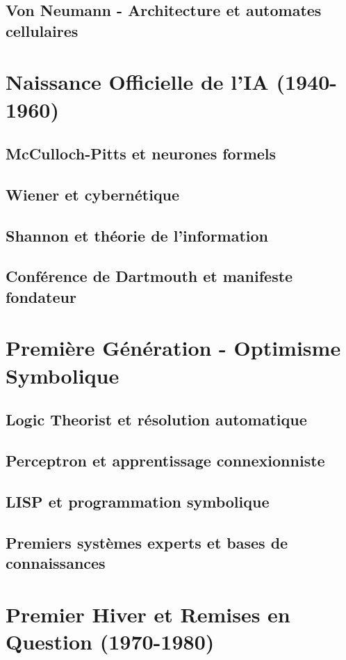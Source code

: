 \documentclass[12pt,a4paper]{book}
\begin{document}
\section{Von Neumann - Architecture et automates cellulaires}

\chapter{Naissance Officielle de l'IA (1940-1960)}
\section{McCulloch-Pitts et neurones formels}
\section{Wiener et cybernétique}
\section{Shannon et théorie de l'information}
\section{Conférence de Dartmouth et manifeste fondateur}

\chapter{Première Génération - Optimisme Symbolique}
\section{Logic Theorist et résolution automatique}
\section{Perceptron et apprentissage connexionniste}
\section{LISP et programmation symbolique}
\section{Premiers systèmes experts et bases de connaissances}

\chapter{Premier Hiver et Remises en Question (1970-1980)}
\end{document}
